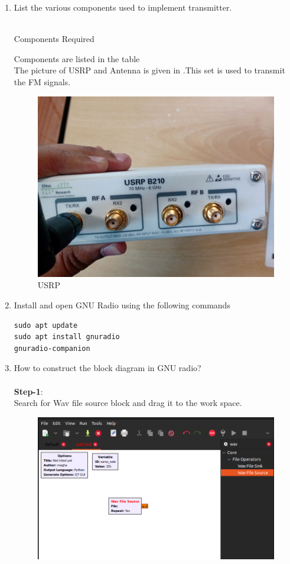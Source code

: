 \begin{enumerate}[label=\arabic*.,ref=\thesection.\theenumi]
\item List the various components used to implement transmitter.
\\
\solution
\\
\begin{table}[!ht]
  \centering
  
  \caption{Components Required}
  \label{tab:txcomponents}
\end{table}
Components are listed in the table \\
The picture of USRP and Antenna is given in .This set is used to transmit the FM signals.
\begin{figure}[H]
\centering
\includegraphics[width=0.5\columnwidth]{fm/tx-gnu/figs/USRP.png}
\caption{USRP}
\label{fig:USRP}
\end{figure}
\item Install and open GNU Radio using the following commands
\\
\begin{lstlisting}
sudo apt update
sudo apt install gnuradio
gnuradio-companion
\end{lstlisting}
\item How to construct the block diagram in GNU radio? \\
	\solution  \\
\textbf{Step-1}:\\
Search for Wav file source block and drag it to the work space.
\begin{figure}[H]
\centering
\includegraphics[width=\columnwidth]{fm/tx-gnu/figs/wav_file.png}

\end{figure}
\end{enumerate}
